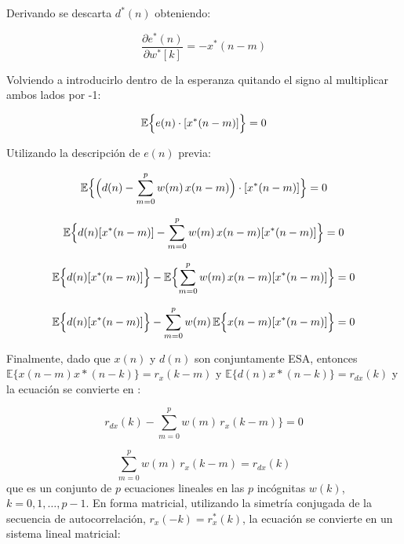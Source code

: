 \documentclass[a4paper]{article}
\begin{document}
Derivando se descarta $d^{\ast}(n)$ obteniendo:

\begin{equation}
	\frac{\partial e^{\ast}(n)}{\partial w^*[k]} = - x^*(n-m)
\end{equation}

Volviendo a introducirlo dentro de la esperanza quitando el signo al multiplicar ambos lados por -1:

\begin{equation}
	\mathbb{E}\Bigl \{ e(n)\cdot [x^*(n-m)]\Bigr \} = 0
\end{equation}

Utilizando la descripción de $e(n)$ previa:

\begin{equation}
	\mathbb{E}\Bigl \{ \Bigl (d(n) - \sum_{m=0}^{p} w(m)\,x(n-m) \Bigr )\cdot [x^*(n-m)] \Bigr \} = 0
\end{equation}


\begin{equation}
	\mathbb{E}\Bigl \{  d(n)[x^*(n-m)] - \sum_{m=0}^{p} w(m)\,x(n-m)[x^*(n-m)] \Bigr \} = 0
\end{equation}




\begin{equation}
	\mathbb{E}\Bigl \{  d(n)[x^*(n-m)]\Bigr \} - \mathbb{E} \Bigl \{ \sum_{m=0}^{p} w(m)\,x(n-m)[x^*(n-m)] \Bigr \} = 0
\end{equation}



\begin{equation}
	\mathbb{E}\Bigl \{  d(n)[x^*(n-m)]\Bigr \} -  \sum_{m=0}^{p} w(m)\, \mathbb{E} \Bigl \{ x(n-m)[x^*(n-m)] \Bigr \} = 0
\end{equation}


Finalmente, dado que $x(n)$ y $d(n)$ son conjuntamente ESA, entonces $\mathbb{E} \{x(n- m )x*(n-k)\} =r_x(k-m)$ y $\mathbb{E} \{d(n)x*(n-k)\} = r_{dx}(k)$ y la ecuación se convierte en : 



\begin{equation}
  r_{dx}(k)  -  \sum_{m=0}^{p} w(m)\, r_x(k-m) \Bigr \} = 0
\end{equation}


\begin{equation}
  \sum_{m=0}^{p} w(m)\, r_x(k-m)  =  r_{dx}(k)
\end{equation}
que es un conjunto de $p$ ecuaciones lineales en las $p$ incógnitas $w(k)$, $k = 0, 1, \dots, p-1$. En forma matricial, utilizando la simetría conjugada de la secuencia de autocorrelación, $r_x(-k) = r_x^*(k)$, la ecuación se convierte en un sistema lineal matricial:
\end{document}
